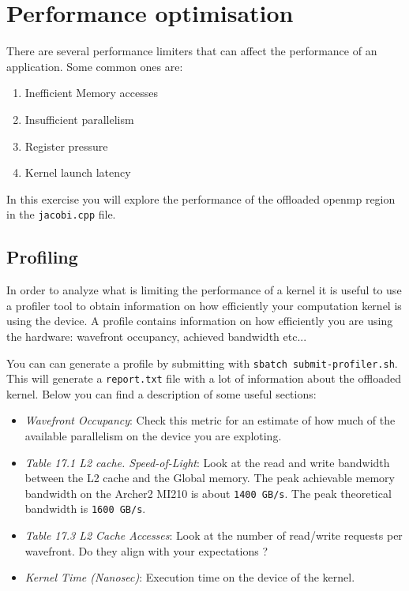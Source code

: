 \documentclass{article}
\begin{document}
\section{Performance optimisation}

There are several performance limiters that can affect the performance of an application. Some common ones are:
\begin{enumerate}
    \item Inefficient Memory accesses
    \item Insufficient parallelism
    \item Register pressure
    \item Kernel launch latency
\end{enumerate}

In this exercise you will explore the performance of the offloaded openmp region in the \texttt{jacobi.cpp} file.
\subsection{Profiling}
In order to analyze what is limiting the performance of a kernel it is useful to use a profiler tool to obtain information on how efficiently your computation kernel is using the device. A profile contains information on how efficiently you are using the hardware: wavefront occupancy, achieved bandwidth etc...

You can can generate a profile by submitting with \texttt{sbatch submit-profiler.sh}. This will generate a \texttt{report.txt} file with a lot of information about the offloaded kernel.
Below you can find a description of some useful sections:

\begin{itemize}
    \item \textit{Wavefront Occupancy}: Check this metric for an estimate of how much of the available parallelism on the device you are exploting.
    \item \textit{Table 17.1 L2 cache. Speed-of-Light}: Look at the read and write bandwidth between the L2 cache and the Global memory. The peak achievable memory bandwidth on the Archer2 MI210 is about \texttt{1400 GB/s}. The peak theoretical bandwidth is \texttt{1600 GB/s}.
    \item \textit{Table 17.3 L2 Cache Accesses}: Look at the number of read/write requests per wavefront. Do they align with your expectations ?
    \item \textit{Kernel Time (Nanosec)}: Execution time on the device of the kernel.
\end{itemize}
\end{document}
